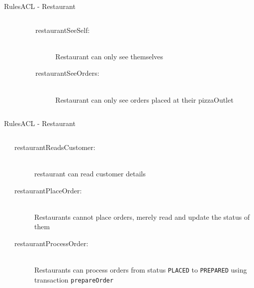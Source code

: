 \documentclass[pdf,table]{beamer}
\begin{document}
\begin{frame}{Rules}{ACL - Restaurant}
	\begin{columns}[T]
		\begin{column}{0.50\textwidth}
			
		\end{column}
		\begin{column}{0.45\textwidth}
		\begin{description}
			\item[restaurantSeeSelf:] \hfill \\ Restaurant can only see themselves 
			\item[restaurantSeeOrders:] \hfill \\ Restaurant can only see orders placed at their pizzaOutlet
		\end{description}	
	\end{column}
	\end{columns}	
\end{frame}


\begin{frame}{Rules}{ACL - Restaurant}
	\begin{columns}[T]
		\begin{column}{0.40\textwidth}
			
		\end{column}
		\begin{column}{0.55\textwidth}
		\begin{description}
			\item[restaurantReadsCustomer:] \hfill \\ restaurant can read customer details
			\item[restaurantPlaceOrder:] \hfill \\ Restaurants cannot place orders, merely read and update the status of them
			\item[restaurantProcessOrder:] \hfill \\ Restaurants can process orders from status {\tt PLACED} to {\tt PREPARED} using transaction {\tt prepareOrder}
		\end{description}	
	\end{column}
	\end{columns}	
\end{frame}
\end{document}
